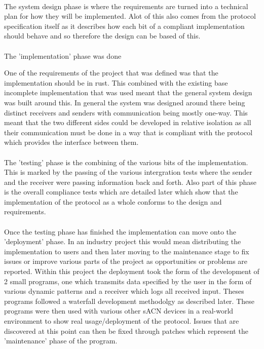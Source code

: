 \documentclass[11pt,a4paper,notitlepage]{report}
\begin{document}
	\paragraph*{}
	The system design phase is where the requirements are turned into a technical plan for how they will be implemented. Alot of this also comes from
	the protocol specification itself as it describes how each bit of a compliant implementation should behave and so therefore the design can be based
	of this.

	\paragraph*{}
	The 'implementation' phase was done 

	One of the requirements
	of the project that was defined was that the implementation should be in rust. This combined with the existing base
	incomplete implementation that was used meant that the general system design was built around this. In general the system
	was designed around there being distinct receivers and senders with communication being mostly one-way. This meant that the two
	different sides could be developed in relative isolation as all their communication must be done in a way that is compliant with the
	protocol which provides the interface between them.

	\paragraph*{}
	The 'testing' phase is the combining of the various bits of the implementation. This is marked by the passing of the various intergration tests
	where the sender and the receiver were passing information back and forth. Also part of this phase is the overall compliance tests which are detailed
	later which show that the implementation of the protocol as a whole conforms to the design and requirements.

	\paragraph*{}
	Once the testing phase has finished the implementation can move onto the 'deployment' phase. In an industry project this would mean 
	distributing the implementation to users and then later moving to the maintenance stage to fix issues or improve various parts of the project
	as opportunities or problems are reported. Within this project the deployment took the form of the development of 2 small programs, one which transmits data 
	specified by the user in the form of various dynamic patterns and a receiver which logs all received input. Theses programs followed a waterfall development
	methodolgy as described later. These programs were then used with various other sACN devices in a real-world environment to show real usage/deployment of
	the protocol. Issues that are discovered at this point can then be fixed through patches which represent the 'maintenance' phase of the program.
	
\end{document}
